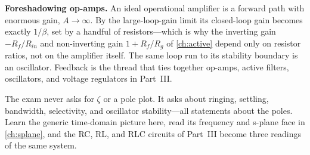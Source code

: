 \begin{controlsbox}
\textbf{Foreshadowing op-amps.} An ideal operational amplifier is a forward path
with enormous gain, \(A\to\infty\). By the large-loop-gain limit its closed-loop
gain becomes exactly \(1/\beta\), set by a handful of resistors---which is why the
inverting gain \(-R_f/R_{in}\) and non-inverting gain \(1+R_f/R_g\) of
\cref{ch:active} depend only on resistor ratios, not on the amplifier itself. The
same loop run to its stability boundary is an oscillator. Feedback is the thread
that ties together op-amps, active filters, oscillators, and voltage regulators in
Part~III.
\end{controlsbox}

\begin{exambox}
The exam never asks for \(\zeta\) or a pole plot. It asks about ringing,
settling, bandwidth, selectivity, and oscillator stability---all statements about
the poles. Learn the generic time-domain picture here, read its frequency and
s-plane face in \cref{ch:splane}, and the RC, RL, and RLC circuits of Part~III
become three readings of the same system.
\end{exambox}
